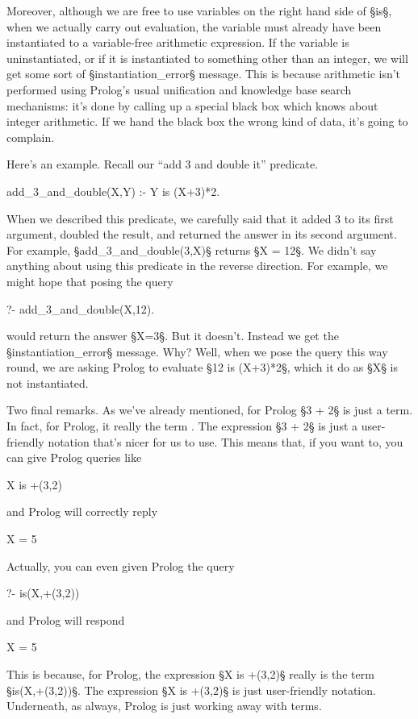 Moreover, although we are free to use variables on the right hand side
of §is§, when we actually carry out evaluation, the variable must
already have been instantiated to a variable-free arithmetic
expression.  If the variable is uninstantiated, or if it is
instantiated to something other than an integer, we will get some sort
of §instantiation_error§ message.  This is because arithmetic isn't
performed using Prolog's usual unification and knowledge base search
mechanisms: it's done by calling up a special black box which knows
about integer arithmetic.  If we hand the black box the wrong kind of
data, it's going to complain.

Here's an example. Recall our ``add 3 and double it''
predicate.
\begin{LPNcodedisplay}
add_3_and_double(X,Y) :- Y is (X+3)*2.
\end{LPNcodedisplay}
When we described this predicate, we carefully said that it added 3 to
its first argument, doubled the result, and returned the answer in its
second argument.  For example, §add_3_and_double(3,X)§ returns
§X = 12§.  We didn't say anything about using this predicate in
the reverse direction.  For example, we might hope that posing the
query
\begin{LPNcodedisplay}
?- add_3_and_double(X,12).
\end{LPNcodedisplay}
would return the answer §X=3§.   But it doesn't. Instead we
get the §instantiation_error§ message.  Why?  Well, when we pose
the query this way round, we are asking Prolog to evaluate
§12 is (X+3)*2§, which it  do as §X§
is not instantiated.

Two final remarks.  As we've already mentioned, for Prolog §3 + 2§
is just a term.  In fact, for Prolog, it really  the term
.  The expression §3 + 2§ is just a user-friendly
notation that's nicer for us to use.  This means that, if you
want to, you can give Prolog queries like
\begin{LPNcodedisplay}
X is +(3,2)
\end{LPNcodedisplay}
and Prolog will correctly reply
\begin{LPNcodedisplay}
X = 5
\end{LPNcodedisplay}
Actually, you can even given Prolog the query
\begin{LPNcodedisplay}
?- is(X,+(3,2))
\end{LPNcodedisplay}
and Prolog will respond
\begin{LPNcodedisplay}
X = 5
\end{LPNcodedisplay}
This is because, for Prolog, the expression §X is +(3,2)§ really is
the term §is(X,+(3,2))§.  The expression §X is +(3,2)§ is just
user-friendly notation.  Underneath, as always, Prolog is just working
away with terms.

